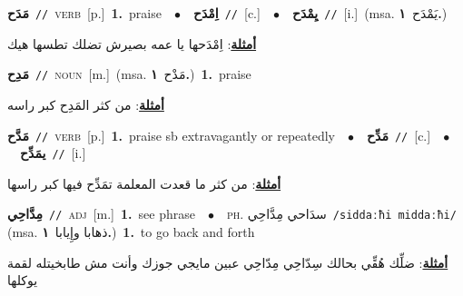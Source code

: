 \documentclass[10pt,a4paper,twoside]{article} %
\begin{document}
\begin{multicols}{2}
{\setlength\topsep{0pt}\textbf{\foreignlanguage{arabic}{مَدَح}}\ {\color{gray}\texttt{//}\color{black}}\ \textsc{verb}\ [p.]\ \textbf{1.}~praise\ \ $\bullet$\ \ \setlength\topsep{0pt}\textbf{\foreignlanguage{arabic}{اِمْدَح}}\ {\color{gray}\texttt{//}\color{black}}\ [c.]\ \ $\bullet$\ \ \setlength\topsep{0pt}\textbf{\foreignlanguage{arabic}{يِمْدَح}}\ {\color{gray}\texttt{//}\color{black}}\ [i.]\ \color{gray}(msa. \foreignlanguage{arabic}{يَمْدَح}~\foreignlanguage{arabic}{\textbf{١.}})\color{black}\  \begin{flushright}\color{gray}\foreignlanguage{arabic}{\textbf{\underline{\foreignlanguage{arabic}{أمثلة}}}: اِمْدَحها يا عمه بصيرش تضلك تطسها هيك}\end{flushright}\color{black}} \vspace{2mm}

{\setlength\topsep{0pt}\textbf{\foreignlanguage{arabic}{مَدِح}}\ {\color{gray}\texttt{//}\color{black}}\ \textsc{noun}\ [m.]\ \color{gray}(msa. \foreignlanguage{arabic}{مَدْح}~\foreignlanguage{arabic}{\textbf{١.}})\color{black}\ \textbf{1.}~praise\  \begin{flushright}\color{gray}\foreignlanguage{arabic}{\textbf{\underline{\foreignlanguage{arabic}{أمثلة}}}: من كثر المَدِح كبر راسه}\end{flushright}\color{black}} \vspace{2mm}

{\setlength\topsep{0pt}\textbf{\foreignlanguage{arabic}{مَدَّح}}\ {\color{gray}\texttt{//}\color{black}}\ \textsc{verb}\ [p.]\ \textbf{1.}~praise sb extravagantly or repeatedly\ \ $\bullet$\ \ \setlength\topsep{0pt}\textbf{\foreignlanguage{arabic}{مَدِّح}}\ {\color{gray}\texttt{//}\color{black}}\ [c.]\ \ $\bullet$\ \ \setlength\topsep{0pt}\textbf{\foreignlanguage{arabic}{يمَدِّح}}\ {\color{gray}\texttt{//}\color{black}}\ [i.]\  \begin{flushright}\color{gray}\foreignlanguage{arabic}{\textbf{\underline{\foreignlanguage{arabic}{أمثلة}}}: من كثر ما قعدت المعلمة تمَدِّح فيها كبر راسها}\end{flushright}\color{black}} \vspace{2mm}

{\setlength\topsep{0pt}\textbf{\foreignlanguage{arabic}{مِدَّاحِي}}\ {\color{gray}\texttt{//}\color{black}}\ \textsc{adj}\ [m.]\ \textbf{1.}~see phrase\ \ $\bullet$\ \ \textsc{ph.} \color{gray} \foreignlanguage{arabic}{سدَاحي مِدَّاحِي}\color{black}\ {\color{gray}\texttt{/{\sffamily siddaːħi middaːħi}/}\color{black}}\ \color{gray} (msa. \foreignlanguage{arabic}{ذهابا وإِيابا}~\foreignlanguage{arabic}{\textbf{١.}})\color{black}\ \textbf{1.}~to go back and forth\  \begin{flushright}\color{gray}\foreignlanguage{arabic}{\textbf{\underline{\foreignlanguage{arabic}{أمثلة}}}: ضلِّك هُقِّي بحالك سِدّاحِي مِدّاحِي عبين مايجي جوزك وأنت مش طابخيتله لقمة يوكلها}\end{flushright}\color{black}} \vspace{2mm}


\end{multicols}
\end{document}
